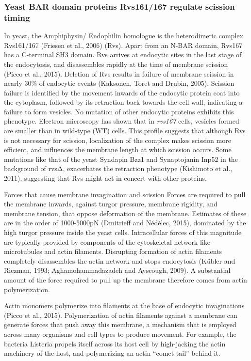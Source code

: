 		\subsubsection{Yeast BAR domain proteins Rvs161/167 regulate scission timing}
In yeast, the Amphiphysin/ Endophilin homologue is the heterodimeric complex Rvs161/167 (Friesen et al., 2006) (Rvs). Apart from an N-BAR domain, Rvs167 has a C-terminal SH3 domain. Rvs arrives at endocytic sites in the last stage of the endocytosis, and disassembles rapidly at the time of membrane scission (Picco et al., 2015). Deletion of Rvs results in failure of membrane scission in nearly 30\% of endocytic events (Kaksonen, Toret and Drubin, 2005). Scission failure is identified by the movement inwards of the endocytic protein coat into the cytoplasm, followed by its retraction back towards the cell wall, indicating a failure to form vesicles. No mutation of other endocytic proteins exhibits this phenotype. Electron microscopy has shown that in \textit{rvs167\textDelta}  cells, vesicles formed are smaller than in wild-type (WT) cells. This profile suggests that although Rvs is not necessary for scission, localization of the complex makes scission more efficient, and influences the membrane length at which scission occurs. Some mutations like that of the yeast Syndapin Bzz1 and Synaptojanin Inp52 in the background of rvsΔ, exacerbates the retraction phenotype (Kishimoto et al., 2011), suggesting that Rvs might act in concert with other proteins. 

Forces that cause membrane invagination and scission
Forces are required to pull the membrane inwards, against turgor pressure, membrane rigidity, and membrane tension, that oppose deformation of the membrane. Estimates of these are in the order of 1000-5000pN (Dmitrieff and Nédélec, 2015), dominated by the high turgor pressure inside the yeast cells. Intracellular forces of this magnitude are typically provided by components of the cytoskeletal network like microtubules and actin filaments. Disrupting formation of actin filaments completely disassembles the actin network and stops endocytosis (Kübler and Riezman, 1993; Aghamohammadazadeh and Ayscough, 2009). A substantial amount of the force required to pull up the membrane therefore comes from actin polymerization.

Actin monomers polymerize into filaments at the base of endocytic invaginations (Picco et al., 2015). Polymerization of actin filaments against a membrane can generate forces that push away this membrane, a mechanism that is employed across many organisms and cell types to produce movement. For example, the bacteria Listeria propels itself across its host cell by high-jacking the actin machinery of the host, and polymerizing an actin “comet tail” behind it. 

